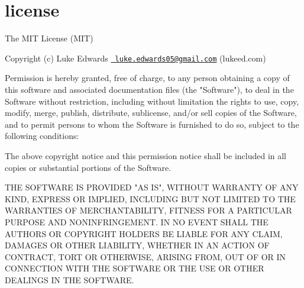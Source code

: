 \chapter{license}
\hypertarget{md_node__modules_2mri_2license}{}\label{md_node__modules_2mri_2license}
The MIT License (MIT)

Copyright (c) Luke Edwards \href{mailto:luke.edwards05@gmail.com}{\texttt{ luke.\+edwards05@gmail.\+com}} (lukeed.\+com)

Permission is hereby granted, free of charge, to any person obtaining a copy of this software and associated documentation files (the "{}\+Software"{}), to deal in the Software without restriction, including without limitation the rights to use, copy, modify, merge, publish, distribute, sublicense, and/or sell copies of the Software, and to permit persons to whom the Software is furnished to do so, subject to the following conditions\+:

The above copyright notice and this permission notice shall be included in all copies or substantial portions of the Software.

THE SOFTWARE IS PROVIDED "{}\+AS IS"{}, WITHOUT WARRANTY OF ANY KIND, EXPRESS OR IMPLIED, INCLUDING BUT NOT LIMITED TO THE WARRANTIES OF MERCHANTABILITY, FITNESS FOR A PARTICULAR PURPOSE AND NONINFRINGEMENT. IN NO EVENT SHALL THE AUTHORS OR COPYRIGHT HOLDERS BE LIABLE FOR ANY CLAIM, DAMAGES OR OTHER LIABILITY, WHETHER IN AN ACTION OF CONTRACT, TORT OR OTHERWISE, ARISING FROM, OUT OF OR IN CONNECTION WITH THE SOFTWARE OR THE USE OR OTHER DEALINGS IN THE SOFTWARE. 